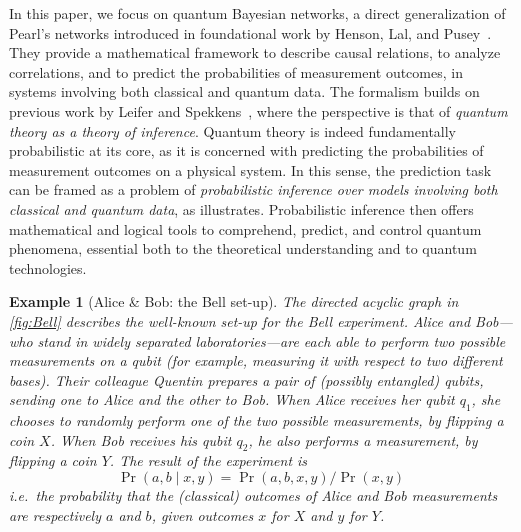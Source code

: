 \documentclass[10pt,a4paper]{article}
\newcommand*{\ie}{\emph{i.e.}\xspace}
\newtheorem{example}[theorem]{Example}
\begin{document}
In this paper, we focus on quantum Bayesian networks, a direct generalization of Pearl's networks introduced in foundational work by Henson, Lal, and Pusey~\cite{GBN2014}.
They provide a mathematical framework to describe causal relations, to analyze correlations, and to predict the probabilities of measurement outcomes, in systems involving both classical and quantum data.
The formalism builds on previous work by Leifer and Spekkens~\cite{LeiferSpekkens2013}, where the perspective is that of \emph{quantum theory as a theory of inference}.
Quantum theory is indeed fundamentally probabilistic at its core, as it is concerned with predicting the probabilities of measurement outcomes on a physical system.
In this sense, the prediction task can be framed as a problem of \emph{probabilistic inference over models involving both classical and quantum data}, as  illustrates.
Probabilistic inference then offers mathematical and logical tools to comprehend, predict, and control quantum phenomena, essential both to the theoretical understanding and to quantum technologies.

\begin{example}[Alice \& Bob: the Bell set-up]
\label{ex:bell}
The directed acyclic graph in \cref{fig:Bell} describes the well-known set-up for the Bell experiment.
Alice and Bob---who stand in widely separated laboratories---are each able to perform two possible measurements on a qubit (for example, measuring it with respect to two different bases). 
Their colleague Quentin prepares a pair of (possibly entangled) qubits, sending one to Alice and the other to Bob. When Alice receives her qubit $q_1$, she chooses to randomly perform one of the two possible measurements, by flipping a coin $X$.
When Bob receives his qubit $q_2$, he also performs a measurement, by flipping a coin $Y$.
The result of the experiment is
\begin{equation}\label{eq:bell}
	\Pr(a,b\mid x,y) =\Pr(a,b,x,y) /\Pr(x,y)
\end{equation}
\ie\ the probability that the (classical) outcomes of Alice and Bob measurements are respectively $a$ and $b$, given outcomes $x$ for $X$ and $y$ for $Y$.
\end{example}
\end{document}
